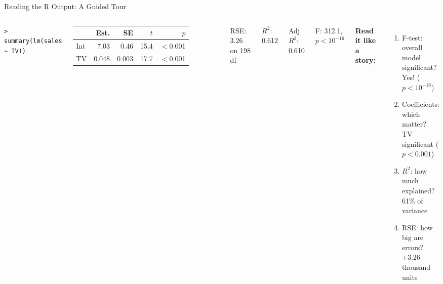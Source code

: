 \documentclass[aspectratio=169, 11pt]{beamer}
\begin{document}
\begin{frame}{Reading the R Output: A Guided Tour}
\footnotesize
\begin{columns}
\texttt{> summary(lm(sales \textasciitilde{} TV))}

\vspace{0.3em}
\begin{tabular}{lrrrr}
\toprule
 & Est. & SE & $t$ & $p$ \\
\midrule
Int & 7.03 & 0.46 & 15.4 & $<$0.001 \\
TV & 0.048 & 0.003 & 17.7 & $<$0.001 \\
\bottomrule
\end{tabular}

\vspace{0.3em}
RSE: 3.26 on 198 df

$R^2$: 0.612

Adj $R^2$: 0.610

F: 312.1, $p < 10^{-16}$

\textbf{Read it like a story:}

\begin{enumerate}
  \item F-test: overall model significant?\\
    \textcolor{softgreen}{Yes!} ($p < 10^{-16}$)
  \item Coefficients: which matter?\\
    \textcolor{softgreen}{TV significant} ($p < 0.001$)
  \item $R^2$: how much explained?\\
    61\% of variance
  \item RSE: how big are errors?\\
    $\pm 3.26$ thousand units
\end{enumerate}
\end{columns}
\end{frame}
\end{document}
